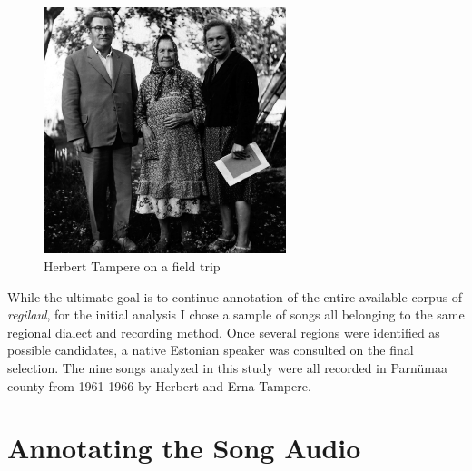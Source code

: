 \begin{figure}[htb]
\centering

\includegraphics[width=200pt]{figures/Mf_07027_Tampered_Orik.jpg}
\caption{Herbert Tampere on a field trip}
\label{tampy}
\end{figure}


While the ultimate goal is to continue annotation of the entire available corpus of {\it regilaul}, for the initial analysis I chose a sample of songs all belonging to the same regional dialect and recording method. Once several regions were identified as possible candidates, a native Estonian speaker was consulted on the final selection. The nine songs analyzed in this study were all recorded in Parnümaa county from 1961-1966 by Herbert and Erna Tampere. 


\section{Annotating the Song Audio }



